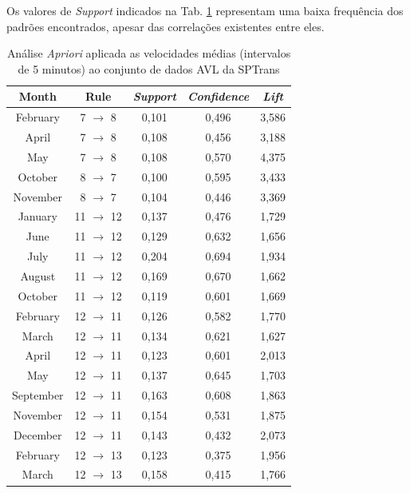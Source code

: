 \documentclass[
	12pt,				%
	oneside,			%
	a4paper,			%
	english,			%
	brazil				%
	]{abntex2ppgsi}
\begin{document}
Os valores de \textit{Support} indicados na Tab. \ref{tab:aprioriFull} representam uma baixa frequência dos padrões encontrados, apesar das correlações existentes entre eles. 

\begin{table}[!htb]
\centering
\begin{threeparttable}
\caption {Análise \textit{Apriori} aplicada as velocidades médias (intervalos de 5 minutos) ao conjunto de dados AVL da SPTrans}
\label {tab:aprioriFull}
\begin{tabular}{c|c|c|c|c}
\hline
\textbf{Month} & \textbf{Rule} & \textit{\textbf{Support}} & \textit{\textbf{Confidence}} & \textit{\textbf{Lift}} \\
\hline
February & 7 $\rightarrow$ 8 & 0,101 & 0,496 & 3,586\\
April & 7 $\rightarrow$ 8  & 0,108 & 0,456 & 3,188\\
May & 7 $\rightarrow$ 8 & 0,108 & 0,570 & 4,375\\
\hline
\hline
October & 8 $\rightarrow$ 7 & 0,100 & 0,595 & 3,433\\
November & 8 $\rightarrow$ 7 & 0,104 & 0,446 & 3,369\\
\hline
\hline
January & 11 $\rightarrow$ 12 & 0,137 & 0,476 & 1,729 \\
June & 11 $\rightarrow$ 12 & 0,129 & 0,632 & 1,656\\
July & 11 $\rightarrow$ 12 & 0,204 & 0,694 & 1,934\\
August & 11 $\rightarrow$ 12 & 0,169 & 0,670 & 1,662\\
October & 11 $\rightarrow$ 12 & 0,119 & 0,601 & 1,669\\
\hline
\hline
February & 12 $\rightarrow$ 11 & 0,126 & 0,582 & 1,770\\
March & 12 $\rightarrow$ 11 & 0,134 & 0,621 & 1,627\\
April & 12 $\rightarrow$ 11 & 0,123 & 0,601 & 2,013\\
May & 12 $\rightarrow$ 11 & 0,137 & 0,645 & 1,703\\
September & 12 $\rightarrow$ 11 & 0,163 & 0,608 & 1,863\\
November & 12 $\rightarrow$ 11 & 0,154 & 0,531 & 1,875\\
December & 12 $\rightarrow$ 11 & 0,143 & 0,432 & 2,073\\
\hline
\hline
February & 12 $\rightarrow$ 13 & 0,123 & 0,375 & 1,956\\
March & 12 $\rightarrow$ 13 & 0,158 & 0,415 & 1,766\\

\end{tabular}
\end{threeparttable}
\end{table}
\end{document}
